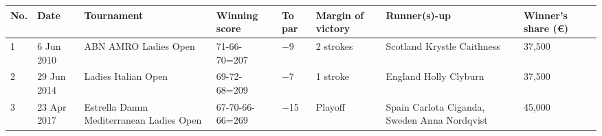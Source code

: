 \documentclass{article}
\begin{document}
\begin{tabular}{llllllll}
\toprule
No. & Date & Tournament & Winning score & To par & Margin of victory & Runner(s)-up & Winner's share (€) \\
\midrule
1 & 6 Jun 2010 & ABN AMRO Ladies Open & 71-66-70=207 & −9 & 2 strokes & Scotland Krystle Caithness & 37,500 \\
2 & 29 Jun 2014 & Ladies Italian Open & 69-72-68=209 & −7 & 1 stroke & England Holly Clyburn & 37,500 \\
3 & 23 Apr 2017 & Estrella Damm Mediterranean Ladies Open & 67-70-66-66=269 & −15 & Playoff & Spain Carlota Ciganda, Sweden Anna Nordqvist & 45,000 \\
\bottomrule
\end{tabular}
\end{document}
